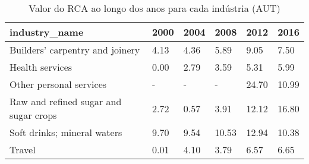 \begin{table}
\centering
\caption{Valor do RCA ao longo dos anos para cada indústria (AUT)}
\begin{tabular}{p{6cm}p{1.5cm}p{1.5cm}p{1.5cm}p{1.5cm}p{1.5cm}}
\toprule
                        industry\_name & 2000 & 2004 &  2008 &  2012 &  2016 \\
\midrule
      Builders' carpentry and joinery & 4.13 & 4.36 &  5.89 &  9.05 &  7.50 \\
                      Health services & 0.00 & 2.79 &  3.59 &  5.31 &  5.99 \\
              Other personal services &    - &    - &     - & 24.70 & 10.99 \\
Raw and refined sugar and sugar crops & 2.72 & 0.57 &  3.91 & 12.12 & 16.80 \\
          Soft drinks; mineral waters & 9.70 & 9.54 & 10.53 & 12.94 & 10.38 \\
                               Travel & 0.01 & 4.10 &  3.79 &  6.57 &  6.65 \\
\bottomrule
\end{tabular}
\end{table}
